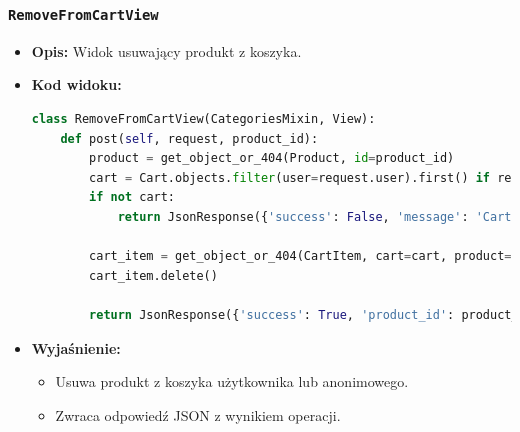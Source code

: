 \documentclass[12pt,a4paper,oneside]{article}
\theoremstyle{definition}
\numberwithin{equation}{section}
\begin{document}
\subsubsection*{\texttt{RemoveFromCartView}}
\begin{itemize}
    \item \textbf{Opis:} Widok usuwający produkt z koszyka.
    \item \textbf{Kod widoku:}
\begin{lstlisting}[language=Python, caption=Kod widoku RemoveFromCartView]
class RemoveFromCartView(CategoriesMixin, View):
    def post(self, request, product_id):
        product = get_object_or_404(Product, id=product_id)
        cart = Cart.objects.filter(user=request.user).first() if request.user.is_authenticated else Cart.objects.filter(id=request.session.get('cart_id')).first()
        if not cart:
            return JsonResponse({'success': False, 'message': 'Cart not found'})

        cart_item = get_object_or_404(CartItem, cart=cart, product=product)
        cart_item.delete()

        return JsonResponse({'success': True, 'product_id': product_id})
\end{lstlisting}

    \item \textbf{Wyjaśnienie:}
    \begin{itemize}
        \item Usuwa produkt z koszyka użytkownika lub anonimowego.
        \item Zwraca odpowiedź JSON z wynikiem operacji.
    \end{itemize}
\end{itemize}
\end{document}
